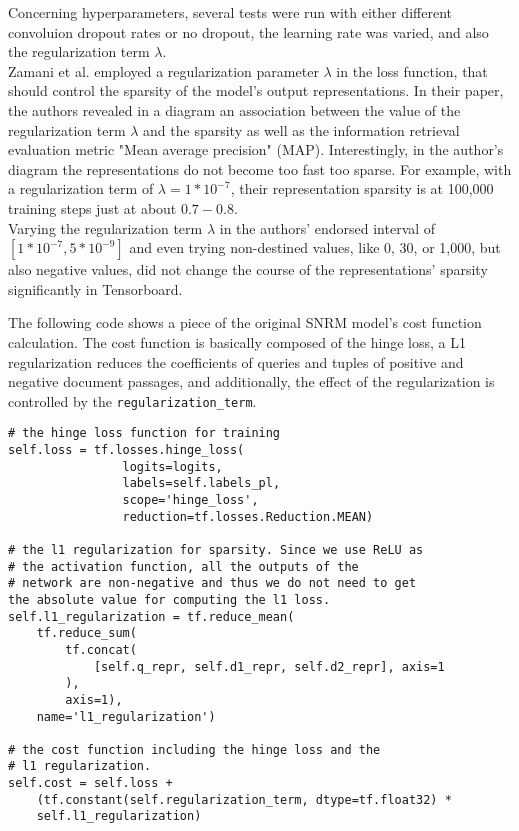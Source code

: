 Concerning hyperparameters, several tests were run with either different convoluion dropout rates or no dropout, 
    the learning rate was varied, and also the regularization term $\lambda$.\\
Zamani et al. employed a regularization parameter $\lambda$
    in the loss function, that should control the sparsity of the model's output representations.
In their paper, the authors revealed in a diagram an association between the value of the regularization term $\lambda$ and the 
    sparsity as well as the information retrieval evaluation metric "Mean average precision" (MAP).
Interestingly, in the author's diagram the representations do not become too fast too sparse.
For example,  with a regularization term of $\lambda=1*10^{-7}$, their representation sparsity is at 100,000 training steps 
    just at about $0.7 - 0.8$. \cite{zamani:2018:from-neural-reranking-to-neural-ranking}\\
Varying the regularization term $\lambda$ in the authors' endorsed interval of $[1*10^{-7}, 5*10^{-9}]$ and 
    even trying non-destined values, like 0, 30, or 1,000, but also negative values, did not change the course 
    of the representations' sparsity significantly in Tensorboard.

The following code shows a piece of the original SNRM model's cost function calculation.
The cost function is basically composed of the hinge loss, a L1 regularization reduces the coefficients of queries and 
    tuples of positive and negative document passages, and additionally, the effect of the regularization is
    controlled by the \texttt{regularization\_term}.

\begin{verbatim}
# the hinge loss function for training
self.loss = tf.losses.hinge_loss(
                logits=logits, 
                labels=self.labels_pl, 
                scope='hinge_loss', 
                reduction=tf.losses.Reduction.MEAN)

# the l1 regularization for sparsity. Since we use ReLU as 
# the activation function, all the outputs of the
# network are non-negative and thus we do not need to get 
the absolute value for computing the l1 loss.
self.l1_regularization = tf.reduce_mean(
    tf.reduce_sum(
        tf.concat(
            [self.q_repr, self.d1_repr, self.d2_repr], axis=1
        ), 
        axis=1),
    name='l1_regularization')

# the cost function including the hinge loss and the 
# l1 regularization.
self.cost = self.loss + 
    (tf.constant(self.regularization_term, dtype=tf.float32) * 
    self.l1_regularization)
\end{verbatim}

